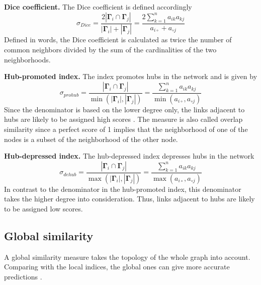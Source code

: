 \textbf{Dice coefficient.} The Dice coefficient is defined accordingly
\begin{equation}
    \label{dice}
    \sigma_{Dice} = \frac{2 |\bm{\Gamma}_i \cap \bm{\Gamma}_j|}{|\bm{\Gamma}_i|+|\bm{\Gamma}_j|}= \frac{2\sum_{k=1}^n a_{ik}a_{kj}}{a_{i \circ }+a_{\circ j}}
\end{equation}
Defined in words, the Dice coefficient is calculated as twice the number of common neighbors divided by the sum of the cardinalities of the two neighborhoods. 

\textbf{Hub-promoted index.} The index promotes hubs in the network and is given by
\begin{equation}
    \label{prohub}
    \sigma_{prohub} = \frac{|\bm{\Gamma}_i \cap \bm{\Gamma}_j|}{\min(|\bm{\Gamma}_i|,|\bm{\Gamma}_j|)} = \frac{\sum_{k=1}^n a_{ik}a_{kj}}{\min(a_{i \circ },a_{\circ j})}
\end{equation}
Since the denominator is based on the lower degree only, the links adjacent to hubs are likely to be assigned high scores \citep{lu2011}. The measure is also called overlap similarity \citep{fouss2016algorithms} since a perfect score of 1 implies that the neighborhood of one of the nodes is a subset of the neighborhood of the other node.

\textbf{Hub-depressed index.} The hub-depressed index depresses hubs in the network \citep{fouss2016algorithms}
\begin{equation}
    \label{dehub}
    \sigma_{dehub} = \frac{|\bm{\Gamma}_i \cap \bm{\Gamma}_j|}{\max(|\bm{\Gamma}_i|,|\bm{\Gamma}_j|)} = \frac{\sum_{k=1}^n a_{ik}a_{kj}}{\max(a_{i \circ },a_{\circ j})}
\end{equation}
In contrast to the denominator in the hub-promoted index, this denominator takes the higher degree into consideration. Thus, links adjacent to hubs are likely to be assigned low scores. 

\begin{comment}
\textbf{Adamic index.} 
\begin{equation}
    \label{adamic}
    \sigma_{Adamic} = \frac{|\bm{\Gamma}_i \cap \bm{\Gamma}_j|}{\log(|\bm{\Gamma}_i|,|\bm{\Gamma}_j|)} = \frac{\sum_{k=1}^n a_{ik}a_{kj}}{\max(a_{i \circ },a_{\circ j})}
\end{equation}
\end{comment}

\subsection{Global similarity}
A global similarity measure takes the topology of the whole graph into account. Comparing with the local indices, the global ones can give more accurate predictions \citep{lu2011}.

